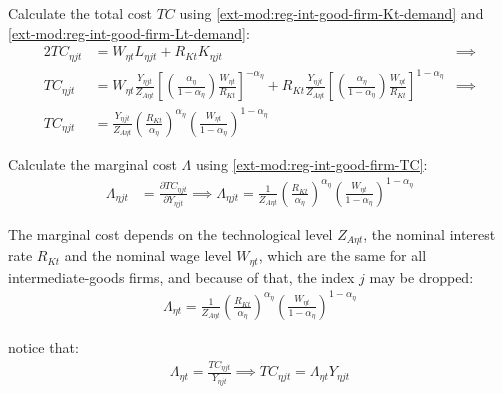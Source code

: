 \documentclass[../thesis.tex]{subfiles}
\begin{document}
Calculate the total cost $TC$ using \ref{ext-mod:reg-int-good-firm-Kt-demand} and \ref{ext-mod:reg-int-good-firm-Lt-demand}:
\begin{alignat}{2}
	TC_{\eta jt} & = W_{\eta t} L_{\eta jt} + R_{Kt} K_{\eta jt} &\implies \nonumber \\
	TC_{\eta jt} & = W_{\eta t} \frac{Y_{\eta jt}}{Z_{A\eta t}} \left[ \left( \frac{{\alpha_{\eta}}}{1-\alpha_{\eta}} \right) \frac{W_{\eta t}}{R_{Kt}} \right]^{-{\alpha_{\eta}}} + R_{Kt} \frac{Y_{\eta jt}}{Z_{A\eta t}} \left[ \left( \frac{{\alpha_{\eta}}}{1-\alpha_{\eta}} \right) \frac{W_{\eta t}}{R_{Kt}} \right]^{1-\alpha_{\eta}} &\implies \nonumber \\
	TC_{\eta jt} & = \frac{Y_{\eta jt}}{Z_{A\eta t}} \left( \frac{R_{Kt}}{{\alpha_{\eta}}} \right)^{{\alpha_{\eta}}} \left( \frac{W_{\eta t}}{1-\alpha_{\eta}} \right)^{1-\alpha_{\eta}} \label{ext-mod:reg-int-good-firm-TC}
\end{alignat}


Calculate the marginal cost $\Lambda$ using \ref{ext-mod:reg-int-good-firm-TC}: 
\begin{align}
	\Lambda_{\eta jt} & = \frac{\partial TC_{\eta jt}}{\partial Y_{\eta jt}} \implies 
	\Lambda_{\eta jt} = \frac{1}{Z_{A\eta t}} \left( \frac{R_{Kt}}{{\alpha_{\eta}}} \right)^{{\alpha_{\eta}}} \left( \frac{W_{\eta t}}{1-\alpha_{\eta}} \right)^{1-\alpha_{\eta}} \label{ext-mod:reg-int-good-firm-MC}
\end{align}

The marginal cost depends on the technological level $Z_{A\eta t}$, the nominal interest rate $R_{Kt}$ and the nominal wage level $W_{\eta t}$, which are the same for all intermediate-goods firms, and because of that, the index $j$ may be dropped:
\begin{align}
	\Lambda_{\eta t} = \frac{1}{Z_{A\eta t}} \left( \frac{R_{Kt}}{{\alpha_{\eta}}} \right)^{{\alpha_{\eta}}} \left( \frac{W_{\eta t}}{1-\alpha_{\eta}} \right)^{1-\alpha_{\eta}} \label{ext-mod:reg-int-good-firm-MC-2}
\end{align}

notice that:
\begin{align}
	\Lambda_{\eta t} = \frac{TC_{\eta jt}}{Y_{\eta jt}} \implies 
	TC_{\eta jt} = \Lambda_{\eta t} Y_{\eta jt} \label{ext-mod:reg-int-good-firm-TC-MC}
\end{align}
\end{document}
